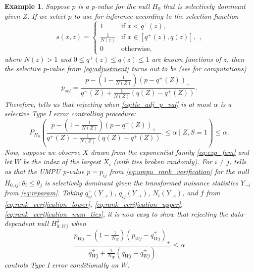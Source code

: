 \documentclass{article}
\newtheorem{example}{Example}
\begin{document}
\begin{appendix}
\begin{example}
    \label{exm:rank_verification_exp_fam}
    Suppose $p$ is a p-value for the null $H_0$ that is selectively dominant given $Z$. If we select $p$ to use for inference according to the selection function 
    \begin{equation*}
        s(x, z) = 
        \begin{cases} 
        1 & \text{if } x < q^+(z), \\
        \frac{1}{N(z)} & \text{if } x \in [q^+(z), q(z)], \\
        0 & \text{otherwise},
        \end{cases},
    \end{equation*}
    where $N(z)> 1$ and $0 \leq q^{+}(z) \leq q(z) \leq 1$ are known functions of $z$, then the selective p-value from \eqref{eq:adjustment} turns out to be (see  for computations)
    \begin{equation}
            \label{eq:tie_adj_p_val}
            p_{sel} = \frac{p - (1-\frac{1}{N(Z)})(p - q^+(Z))_+ }{q^+(Z) + \frac{1}{N(Z)}(q(Z) - q^+(Z))}.
     \end{equation}
    Therefore,  tells us that rejecting when \eqref{eq:tie_adj_p_val} is at most $\alpha$ is a selective Type I error controlling procedure:
    \begin{equation}
        \label{eq:tie_tool}
        P_{H_0}\left( \frac{p - (1-\frac{1}{N(Z)})(p - q^+(Z))_+ }{q^+(Z) + \frac{1}{N(Z)}(q(Z) - q^+(Z))}.  \leq \alpha \mid Z, S = 1\right) \leq \alpha.  
    \end{equation} 
    Now, suppose we observe $X$ drawn from the exponential family \eqref{eq:exp_fam} and let $W$ be the index of the largest $X_i$ (with ties broken randomly). For $i \neq j$,  tells us that the UMPU p-value $p = p_{ij}$ from \eqref{eq:umpu_rank_verification} for the null $H_{0, ij}: \theta_i \leq \theta_j $ is selectively dominant given the transformed nuisance statistics $Y_{-i}$ from \eqref{eq:reparam}. Taking $q_{ij}^+(Y_{-i})$, $q_{ij}(Y_{-i})$, $N_i(Y_{-i})$, and $f$ from  \eqref{eq:rank_verification_lower}, \eqref{eq:rank_verification_upper}, \eqref{eq:rank_verification_num_ties}, it is now easy to show that rejecting the data-dependent null $H^{\delta}_{0, Wj}$ when 
    \begin{equation}
      \frac{p_{Wj} - (1-\frac{1}{N_W})(p_{Wj} - q_{Wj}^+)_+ }{q_{Wj}^+ + \frac{1}{N_W}(q_{Wj} - q^+_{Wj})} \leq \alpha
    \end{equation} 
    controls Type I error conditionally on $W$.
    

\end{example}
\end{appendix}
\end{document}

